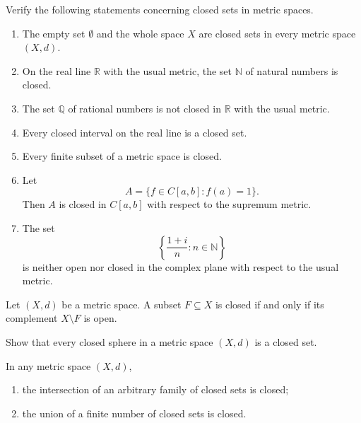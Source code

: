 \documentclass[12pt, a4paper]{article}
\begin{document}
\clearpage

\begin{problem}
Verify the following statements concerning closed sets in metric spaces.

\begin{enumerate}
    \item The empty set $\emptyset$ and the whole space $X$ are closed sets in every metric
    space $(X,d)$.

    \item On the real line $\mathbb{R}$ with the usual metric, the set $\mathbb{N}$ of natural
    numbers is closed.

    \item The set $\mathbb{Q}$ of rational numbers is not closed in $\mathbb{R}$ with the usual
    metric.

    \item Every closed interval on the real line is a closed set.

    \item Every finite subset of a metric space is closed.

    \item Let
    \[
    A=\{f\in C[a,b]: f(a)=1\}.
    \]
    Then $A$ is closed in $C[a,b]$ with respect to the supremum metric.

    \item The set
    \[
    \left\{\frac{1+i}{n}: n\in\mathbb{N}\right\}
    \]
    is neither open nor closed in the complex plane with respect to the usual metric.
\end{enumerate}
\end{problem}


\clearpage

\begin{theorem}
Let $(X,d)$ be a metric space. A subset $F\subseteq X$ is closed if and only if its complement
$X\setminus F$ is open.
\end{theorem}

\clearpage

\begin{problem}
Show that every closed sphere in a metric space $(X,d)$ is a closed set.
\end{problem}

\clearpage

\begin{theorem}
In any metric space $(X,d)$,
\begin{enumerate}
    \item the intersection of an arbitrary family of closed sets is closed;
    \item the union of a finite number of closed sets is closed.
\end{enumerate}
\end{theorem}
\end{document}
